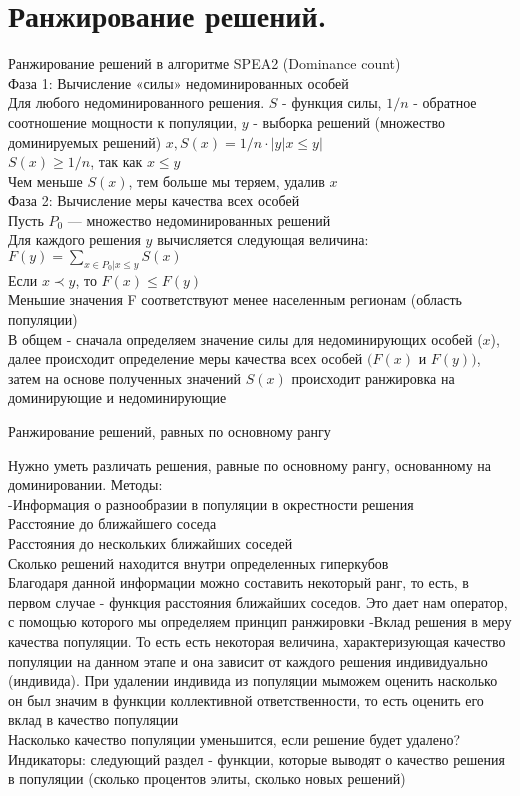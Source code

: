 \section{Ранжирование решений.}
Ранжирование решений в алгоритме SPEA2 (Dominance count)\\
Фаза 1: Вычисление «силы» недоминированных особей\\
Для любого недоминированного решения. $S$ - функция силы, $1/n$ - обратное соотношение мощности к популяции, $y$ - выборка решений (множество доминируемых решений) $x, S(x) = 1/n·|{y | x ≤ y}|$\\
$S(x) ≥ 1/n$, так как $x ≤ y$\\
Чем меньше $S(x)$, тем больше мы теряем, удалив $x$\\
Фаза 2: Вычисление меры качества всех особей\\
Пусть $P_{0}$ — множество недоминированных решений\\
Для каждого решения $y$ вычисляется следующая величина:\\
$F(y) = \sum_{x ∈ P_{0}|x≤y} S(x)$\\
Если $x ≺ y$, то $F(x) ≤ F(y)$\\
Меньшие значения F соответствуют менее населенным регионам (область популяции)\\


В общем - сначала определяем значение силы для недоминирующих особей ($x$), далее происходит определение меры качества всех особей $(F(x)$ и $F(y))$, затем на основе полученных значений $S(x)$ происходит ранжировка на доминирующие и недоминирующие

Ранжирование решений, равных по основному рангу

Нужно уметь различать решения, равные по основному рангу,
основанному на доминировании.
Методы:\\
-Информация о разнообразии в популяции в окрестности решения\\
Расстояние до ближайшего соседа\\
Расстояния до нескольких ближайших соседей\\
Сколько решений находится внутри определенных гиперкубов\\
Благодаря данной информации можно составить некоторый ранг, то есть, в первом случае - функция расстояния ближайших соседов. Это дает нам оператор, с помощью которого мы определяем принцип ранжировки
-Вклад решения в меру качества популяции. То есть есть некоторая величина, характеризующая качество популяции на данном этапе и она зависит от каждого решения индивидуально (индивида). При удалении индивида из популяции мыможем оценить насколько он был значим в функции коллективной ответственности, то есть оценить его вклад в качество популяции\\
Насколько качество популяции уменьшится, если решение будет удалено?\\
Индикаторы: следующий раздел - функции, которые выводят о качество решения в популяции (сколько процентов элиты, сколько новых решений)
